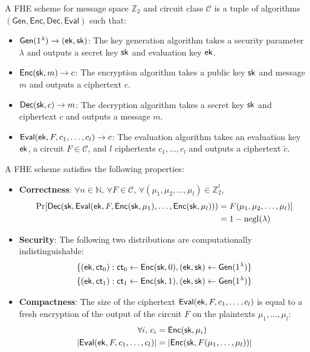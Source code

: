 \begin{definition}
    A FHE scheme for message space $\mathbb{Z}_2$ and circuit class $\mathcal{C}$ is a tuple of algorithms $(\mathsf{Gen}, \mathsf{Enc}, \mathsf{Dec}, \mathsf{Eval})$ such that:
    \begin{itemize}
        \item $\mathsf{Gen}(1^\lambda) \rightarrow (\mathsf{ek}, \mathsf{sk})$: The key generation algorithm takes a security parameter $\lambda$ and outputs a secret key $\mathsf{sk}$ and evaluation key $\mathsf{ek}$.
        \item $\mathsf{Enc}(\mathsf{sk}, m) \rightarrow c$: The encryption algorithm takes a public key $\mathsf{sk}$ and message $m$ and outputs a ciphertext $c$.
        \item $\mathsf{Dec}(\mathsf{sk}, c) \rightarrow m$: The decryption algorithm takes a secret key $\mathsf{sk}$ and ciphertext $c$ and outputs a message $m$.
        \item $\mathsf{Eval}(\mathsf{ek}, F, c_1, \ldots, c_l) \rightarrow c$: The evaluation algorithm takes an evaluation key $\mathsf{ek}$, a circuit $F \in \mathcal{C}$, and $l$ ciphertexts $c_1, \ldots, c_l$ and outputs a ciphertext $\tilde{c}$.
    \end{itemize}
\end{definition}

A FHE scheme satisfies the following properties:
\begin{itemize}
    \item \textbf{Correctness}: $\forall n \in \mathbb{N},\, \forall F \in \mathcal{C},\, \forall (\mu_1, \mu_2, \dots, \mu_l) \in \mathbb{Z}_2^l$,
    \begin{align*}
        \Pr[\mathsf{Dec}(\mathsf{sk}, \mathsf{Eval}(\mathsf{ek}, F, \mathsf{Enc}(\mathsf{sk}, \mu_1), \dots, \mathsf{Enc}(\mathsf{sk}, \mu_l))) &= F(\mu_1, \mu_2, \dots, \mu_l)] \\
        &= 1 - \text{negl}(\lambda)
    \end{align*}

    \item \textbf{Security}: The following two distributions are computationally indistinguishable:
    \begin{align*}
        \{(\mathsf{ek}, \mathsf{ct}_0): \mathsf{ct}_0 \gets \mathsf{Enc}(\mathsf{sk}, 0), (\mathsf{ek}, \mathsf{sk}) \gets \mathsf{Gen}(1^\lambda)\} \\
        \{(\mathsf{ek}, \mathsf{ct}_1): \mathsf{ct}_1 \gets \mathsf{Enc}(\mathsf{sk}, 1), (\mathsf{ek}, \mathsf{sk}) \gets \mathsf{Gen}(1^\lambda)\}
    \end{align*}

    \item \textbf{Compactness}: The size of the ciphertext $\mathsf{Eval}(\mathsf{ek}, F, c_1, \ldots, c_l)$ is equal to a fresh encryption of the output of the circuit $F$ on the plaintexts $\mu_1, \ldots, \mu_l$:
    \begin{align*}
        \forall i,\, c_i &= \mathsf{Enc}(\mathsf{sk}, \mu_i) \\
        \lvert \mathsf{Eval}(\mathsf{ek}, F, c_1, \ldots, c_l) \rvert &= \lvert \mathsf{Enc}(\mathsf{sk}, F(\mu_1, \ldots, \mu_l)) \rvert
    \end{align*}
\end{itemize}

